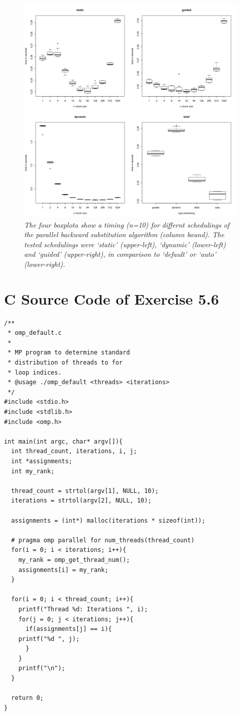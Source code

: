 \documentclass[a4paper,11pt,twoside]{article}
\begin{document}
\begin{figure}
  \centering
  \includegraphics[width=1\textwidth]{scheduling.png}
  \caption{\textit{The four boxplota show a timing (n=10) for differnt schedulings of the parallel backward substitution algorithm (column bound). The tested schedulings were `static' (upper-left), `dynamic' (lower-left) and  `guided' (upper-right), in comparison to `default' or `auto' (lower-right). }}
  \label{fig:scheduling}
\end{figure}

\appendix

\section{C Source Code of Exercise 5.6}{\label{app:default}}
\begin{verbatim}
/**
 * omp_default.c
 * 
 * MP program to determine standard 
 * distribution of threads to for
 * loop indices.
 * @usage ./omp_default <threads> <iterations> 
 */
#include <stdio.h>
#include <stdlib.h>
#include <omp.h>

int main(int argc, char* argv[]){
  int thread_count, iterations, i, j;
  int *assignments;
  int my_rank;

  thread_count = strtol(argv[1], NULL, 10);
  iterations = strtol(argv[2], NULL, 10);

  assignments = (int*) malloc(iterations * sizeof(int));

  # pragma omp parallel for num_threads(thread_count)
  for(i = 0; i < iterations; i++){
    my_rank = omp_get_thread_num();
    assignments[i] = my_rank;
  }

  for(i = 0; i < thread_count; i++){
    printf("Thread %d: Iterations ", i);
    for(j = 0; j < iterations; j++){
      if(assignments[j] == i){
	printf("%d ", j);
      }
    }
    printf("\n");
  }

  return 0;
}

\end{verbatim}
\end{document}
